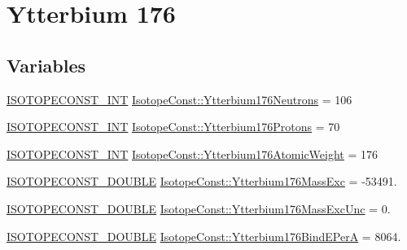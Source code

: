 \hypertarget{group___isotope_const-_ytterbium-_yb176}{}\section{Ytterbium 176}
\label{group___isotope_const-_ytterbium-_yb176}
\subsection*{Variables}
\begin{DoxyCompactItemize}
\item 
\mbox{\hyperlink{group___isotope_const-_macros_ga5f18360b3e99483a35c32d789e62621c}{I\+S\+O\+T\+O\+P\+E\+C\+O\+N\+S\+T\+\_\+\+I\+NT}} \mbox{\hyperlink{group___isotope_const-_ytterbium-_yb176_ga8fb6b78d77700b8942dbf99e427ece38}{Isotope\+Const\+::\+Ytterbium176\+Neutrons}} = 106
\item 
\mbox{\hyperlink{group___isotope_const-_macros_ga5f18360b3e99483a35c32d789e62621c}{I\+S\+O\+T\+O\+P\+E\+C\+O\+N\+S\+T\+\_\+\+I\+NT}} \mbox{\hyperlink{group___isotope_const-_ytterbium-_yb176_ga44d7abe7a1f06c7082166410375a1ba9}{Isotope\+Const\+::\+Ytterbium176\+Protons}} = 70
\item 
\mbox{\hyperlink{group___isotope_const-_macros_ga5f18360b3e99483a35c32d789e62621c}{I\+S\+O\+T\+O\+P\+E\+C\+O\+N\+S\+T\+\_\+\+I\+NT}} \mbox{\hyperlink{group___isotope_const-_ytterbium-_yb176_ga2fca4528608e6bfe6dff9cd4837281c8}{Isotope\+Const\+::\+Ytterbium176\+Atomic\+Weight}} = 176
\item 
\mbox{\hyperlink{group___isotope_const-_macros_ga8f45a7272ce02c0b4c65c44636ed719a}{I\+S\+O\+T\+O\+P\+E\+C\+O\+N\+S\+T\+\_\+\+D\+O\+U\+B\+LE}} \mbox{\hyperlink{group___isotope_const-_ytterbium-_yb176_gac75842746c2825c2b6a2e4de1c3eb27a}{Isotope\+Const\+::\+Ytterbium176\+Mass\+Exc}} = -\/53491.
\item 
\mbox{\hyperlink{group___isotope_const-_macros_ga8f45a7272ce02c0b4c65c44636ed719a}{I\+S\+O\+T\+O\+P\+E\+C\+O\+N\+S\+T\+\_\+\+D\+O\+U\+B\+LE}} \mbox{\hyperlink{group___isotope_const-_ytterbium-_yb176_ga01873f8d0dc12aff00b81ac3b9dbd3d7}{Isotope\+Const\+::\+Ytterbium176\+Mass\+Exc\+Unc}} = 0.
\item 
\mbox{\hyperlink{group___isotope_const-_macros_ga8f45a7272ce02c0b4c65c44636ed719a}{I\+S\+O\+T\+O\+P\+E\+C\+O\+N\+S\+T\+\_\+\+D\+O\+U\+B\+LE}} \mbox{\hyperlink{group___isotope_const-_ytterbium-_yb176_ga2bbba784b7ccefdbfbed975b8f5e3ff6}{Isotope\+Const\+::\+Ytterbium176\+Bind\+E\+PerA}} = 8064.
\item 

\end{DoxyCompactItemize}
